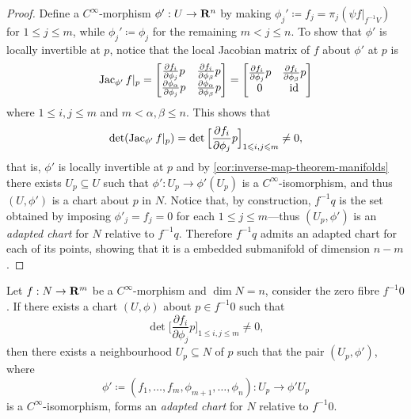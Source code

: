 \begin{proof}
    Define a \(C^{\infty}\)-morphism \(\phi': U \to \mathbf{R}^n\) by making
    \(\phi_j' \coloneq f_j = \pi_j (\psi f|_{f^{-1} V})\) for \(1 \leq j \leq m\),
    while \(\phi_j' \coloneq \phi_j\) for the remaining \(m < j \leq n\). To show
    that \(\phi'\) is locally invertible at \(p\), notice that the local Jacobian
    matrix of \(f\) about \(\phi'\) at \(p\) is
    \[
        \operatorname{Jac}_{\phi'} f|_p =
        \begin{bmatrix}
            \frac{\partial f_i}{\partial \phi_j} p
             & \frac{\partial f_{i}}{\partial \phi_{\beta}} p
            \\
            \frac{\partial \phi_{\alpha}}{\partial \phi_j} p
             & \frac{\partial \phi_{\alpha}}{\partial \phi_{\beta}} p
        \end{bmatrix}
        =
        \begin{bmatrix}
            \frac{\partial f_i}{\partial \phi_j} p
             & \frac{\partial f_{i}}{\partial \phi_{\beta}} p
            \\
            0
             & \operatorname{id}
        \end{bmatrix}
    \]
    where \(1 \leq i, j \leq m\) and \(m < \alpha, \beta \leq n\). This shows that
    \[
        \det(\operatorname{Jac}_{\phi'} f|_p)
        = \det \Big[ \frac{\partial f_{i}}{\partial \phi_j} p \Big]_{1 \leqslant i, j \leqslant m}
        \neq 0,
    \]
    that is, \(\phi'\) is locally invertible at \(p\) and by
    \cref{cor:inverse-map-theorem-manifolds} there exists \(U_p \subseteq U\) such
    that \(\phi': U_p \to \phi'(U_p)\) is a \(C^{\infty}\)-isomorphism, and thus
    \((U, \phi')\) is a chart about \(p\) in \(N\). Notice that, by construction,
    \(f^{-1} q\) is the set obtained by imposing \(\phi'_j = f_j = 0\) for each
    \(1 \leq j \leq m\)---thus \((U_p, \phi')\) is an \emph{adapted chart} for \(N\)
    relative to \(f^{-1} q\). Therefore \(f^{-1} q\) admits an adapted chart for
    each of its points, showing that it is a embedded submanifold of dimension
    \(n - m\).
\end{proof}

\begin{corollary}
    \label{cor:regular-fibre-producing-adapted-charts}
    Let \(f: N \to \mathbf{R}^m\) be a \(C^{\infty}\)-morphism and \(\dim N = n\), consider
    the zero fibre \(f^{-1} 0\). If there exists a chart \((U, \phi)\) about
    \(p \in f^{-1} 0\) such that
    \[
        \det \Big[ \frac{\partial f_i}{\partial \phi_j} p \Big]_{1 \leq i, j \leq m}
        \neq 0,
    \]
    then there exists a neighbourhood \(U_p \subseteq N\) of \(p\) such that the
    pair \((U_p, \phi')\), where
    \[
        \phi' \coloneq (f_1, \dots, f_m, \phi_{m+1}, \dots, \phi_n):
        U_p \longrightarrow \phi' U_p
    \]
    is a \(C^{\infty}\)-isomorphism, forms an \emph{adapted chart} for \(N\)
    relative to \(f^{-1} 0\).
\end{corollary}

